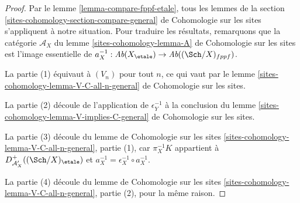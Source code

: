 \begin{proof}
Par le lemme \ref{lemma-compare-fppf-etale}, tous les lemmes de la
section \ref{sites-cohomology-section-compare-general} de Cohomologie sur les sites
s'appliquent à notre situation. Pour traduire les résultats,
remarquons que la catégorie $\mathcal{A}_X$ du
lemme \ref{sites-cohomology-lemma-A} de Cohomologie sur les sites
est l'image essentielle de
$a_X^{-1} : \textit{Ab}(X_\etale) \to \textit{Ab}((\Sch/X)_{fppf})$.

\medskip\noindent
La partie (1) équivaut à $(V_n)$ pour tout $n$, ce qui vaut par le
lemme \ref{sites-cohomology-lemma-V-C-all-n-general} de Cohomologie sur les sites.

\medskip\noindent
La partie (2) découle de l'application de $\epsilon_Y^{-1}$ à la conclusion du
lemme \ref{sites-cohomology-lemma-V-implies-C-general} de Cohomologie sur les sites.

\medskip\noindent
La partie (3) découle du lemme de Cohomologie sur les sites
\ref{sites-cohomology-lemma-V-C-all-n-general}, partie (1),
car $\pi_X^{-1}K$ appartient à $D^+_{\mathcal{A}'_X}((\Sch/X)_\etale)$
et $a_X^{-1} = \epsilon_X^{-1} \circ a_X^{-1}$.

\medskip\noindent
La partie (4) découle du lemme de Cohomologie sur les sites
\ref{sites-cohomology-lemma-V-C-all-n-general}, partie (2),
pour la même raison.


\end{proof}
